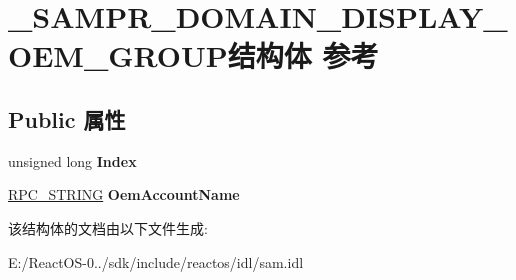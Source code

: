 \hypertarget{struct___s_a_m_p_r___d_o_m_a_i_n___d_i_s_p_l_a_y___o_e_m___g_r_o_u_p}{}\section{\+\_\+\+S\+A\+M\+P\+R\+\_\+\+D\+O\+M\+A\+I\+N\+\_\+\+D\+I\+S\+P\+L\+A\+Y\+\_\+\+O\+E\+M\+\_\+\+G\+R\+O\+U\+P结构体 参考}
\label{struct___s_a_m_p_r___d_o_m_a_i_n___d_i_s_p_l_a_y___o_e_m___g_r_o_u_p}
\subsection*{Public 属性}
\begin{DoxyCompactItemize}
\item 
\mbox{\label{struct___s_a_m_p_r___d_o_m_a_i_n___d_i_s_p_l_a_y___o_e_m___g_r_o_u_p_af2ee15a05a800734ea04daec7612371f}} 
unsigned long {\bfseries Index}
\item 
\mbox{\label{struct___s_a_m_p_r___d_o_m_a_i_n___d_i_s_p_l_a_y___o_e_m___g_r_o_u_p_a011593fa04589dd741fe2fa9599d5616}} 
\hyperlink{struct___r_p_c___s_t_r_i_n_g}{R\+P\+C\+\_\+\+S\+T\+R\+I\+NG} {\bfseries Oem\+Account\+Name}
\end{DoxyCompactItemize}


该结构体的文档由以下文件生成\+:\begin{DoxyCompactItemize}
\item 
E\+:/\+React\+O\+S-\/0../sdk/include/reactos/idl/sam.\+idl\end{DoxyCompactItemize}
